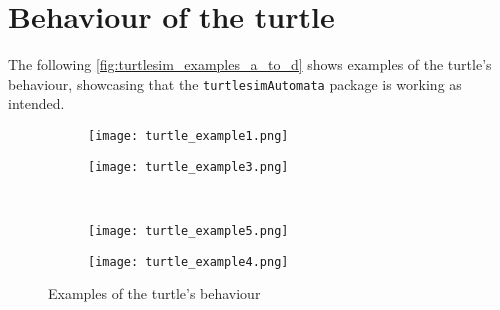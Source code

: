\chapter{Behaviour of the turtle}
\label{chapter:behaviour_of_the_turtle}

The following \autoref{fig:turtlesim_examples_a_to_d} shows examples of the turtle's behaviour, showcasing that the \texttt{turtlesimAutomata} package is working as intended.


\begin{figure}[htbp]
    \centering
    \begin{subfigure}[b]{0.40\textwidth}
        \centering
        \texttt{[image: turtle\_example1.png]}
        \caption{}
        \label{fig:example_a}
    \end{subfigure}
    \hfill
    \begin{subfigure}[b]{0.40\textwidth}
        \centering
        \texttt{[image: turtle\_example3.png]}
        \caption{}
        \label{fig:example_b}
    \end{subfigure}
\\
    \centering
    \begin{subfigure}[b]{0.40\textwidth}
        \centering
        \texttt{[image: turtle\_example5.png]}
        \caption{}
        \label{fig:example_c}
    \end{subfigure}
    \hfill
    \begin{subfigure}[b]{0.40\textwidth}
        \centering
        \texttt{[image: turtle\_example4.png]}
        \caption{}
        \label{fig:example_d}
    \end{subfigure}
    \caption{Examples of the turtle's behaviour}
    \label{fig:turtlesim_examples_a_to_d}
\end{figure}


